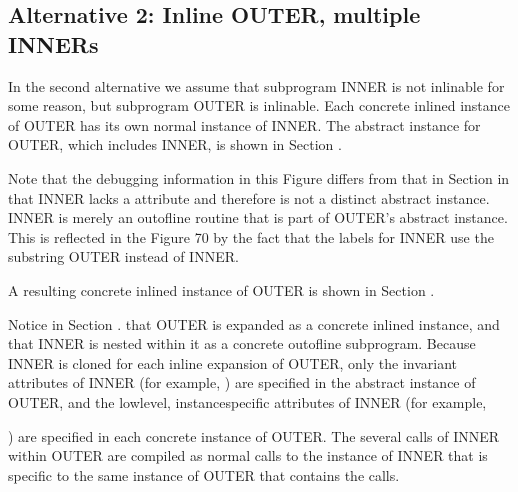 \subsection{Alternative 2: Inline OUTER, multiple INNERs}
\label{app:inlineoutermultiipleinners}


In the second alternative we assume that subprogram INNER
is not inlinable for some reason, but subprogram OUTER is
inlinable. 
Each concrete inlined instance of OUTER has its
own normal instance of INNER. 
The abstract instance for OUTER,
which includes INNER, is shown in 
Section .

Note that the debugging information in this Figure differs from
that in 
Section 
in that INNER lacks a 
 attribute
and therefore is not a distinct abstract instance. INNER
is merely an out\dash of\dash line routine that is part of OUTER’s
abstract instance. This is reflected in the Figure 70 by
the fact that the labels for INNER use the substring OUTER
instead of INNER.

A resulting 
concrete inlined instance of OUTER is shown in
Section .

Notice in 
Section .
that OUTER is expanded as a concrete
inlined instance, and that INNER is nested within it as a
concrete out\dash of\dash line subprogram. Because INNER is cloned
for each inline expansion of OUTER, only the invariant
attributes of INNER 
(for example, ) are specified
in the abstract instance of OUTER, and the low\dash level,
instance\dash specific attributes of INNER (for example,

) are specified in 
each concrete instance of OUTER.
The several calls of INNER within OUTER are compiled as normal
calls to the instance of INNER that is specific to the same
instance of OUTER that contains the calls.


